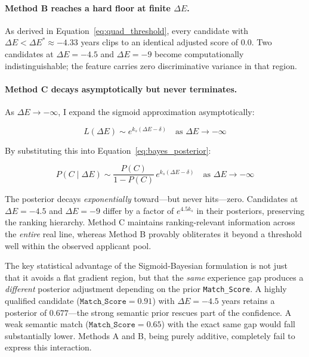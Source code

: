 \paragraph{Method B reaches a hard floor at finite $\Delta E$.} As derived in Equation~\eqref{eq:quad_threshold}, every candidate with $\Delta E < \Delta E^* \approx -4.33$ years clips to an identical adjusted score of $0.0$. Two candidates at $\Delta E = -4.5$ and $\Delta E = -9$ become computationally indistinguishable; the feature carries zero discriminative variance in that region.

\paragraph{Method C decays asymptotically but never terminates.} As $\Delta E \to -\infty$, I expand the sigmoid approximation asymptotically:

\begin{equation}
L(\Delta E) \sim e^{k_s(\Delta E - \delta)} \quad \text{as } \Delta E \to -\infty
\label{eq:sigmoid_asymptotic}
\end{equation}

\vspace{0.5em}

By substituting this into Equation~\eqref{eq:bayes_posterior}:

\begin{equation}
P(C \mid \Delta E) \sim \frac{P(C)}{1-P(C)}\, e^{k_s(\Delta E - \delta)} \quad \text{as } \Delta E \to -\infty
\label{eq:posterior_asymptotic}
\end{equation}

\vspace{0.5em}

The posterior decays \emph{exponentially} toward---but never hits---zero. Candidates at $\Delta E = -4.5$ and $\Delta E = -9$ differ by a factor of $e^{4.5 k_s}$ in their posteriors, preserving the ranking hierarchy. Method C maintains ranking-relevant information across the \emph{entire} real line, whereas Method B provably obliterates it beyond a threshold well within the observed applicant pool.

\begin{insightbox}
The key statistical advantage of the Sigmoid-Bayesian formulation is not just that it avoids a flat gradient region, but that the \emph{same} experience gap produces a \emph{different} posterior adjustment depending on the prior \texttt{Match\_Score}. A highly qualified candidate ($\texttt{Match\_Score} = 0.91$) with $\Delta E = -4.5$ years retains a posterior of $0.677$---the strong semantic prior rescues part of the confidence. A weak semantic match ($\texttt{Match\_Score} = 0.65$) with the exact same gap would fall substantially lower. Methods A and B, being purely additive, completely fail to express this interaction.
\end{insightbox}

